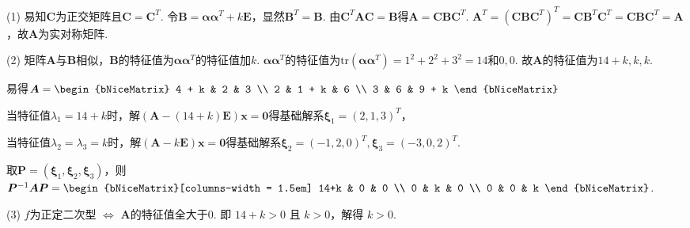 \documentclass[12pt, a4paper, oneside, UTF8]{ctexbook}
\begin{document}
\begin{solution}
    (1) 易知$\bm{C}$为正交矩阵且$\bm{C}=\bm{C}^T$. 令$\bm{B}=\bm{\alpha\alpha}^T+k\bm{E}$，显然$\bm{B}^T=\bm{B}$.
    由$\bm{C}^T\bm{AC}=\bm{B}$得$\bm{A}=\bm{C}\bm{B}\bm{C}^T$.
    $\bm{A}^T = (\bm{C}\bm{B}\bm{C}^T)^T = \bm{C}\bm{B}^T\bm{C}^T = \bm{C}\bm{B}\bm{C}^T = \bm{A}$，故$\bm{A}$为实对称矩阵.

    (2) 矩阵$\bm{A}$与$\bm{B}$相似，$\bm{B}$的特征值为$\bm{\alpha\alpha}^T$的特征值加$k$.
    $\bm{\alpha\alpha}^T$的特征值为$\text{tr}(\bm{\alpha\alpha}^T)=1^2+2^2+3^2=14$和$0,0$.
    故$\bm{A}$的特征值为$14+k, k, k$.
    
    易得$\bm{A}=\begin{bNiceMatrix}
        4 + k & 2 & 3 \\
        2 & 1 + k & 6 \\
        3 & 6 & 9 + k
    \end{bNiceMatrix}$

    当特征值$\lambda_1=14+k$时，解$(\bm{A}-(14+k)\bm{E})\bm{x}=\bm{0}$得基础解系$\bm{\xi}_1=(2,1,3)^T$，

    当特征值$\lambda_2=\lambda_3=k$时，解$(\bm{A}-k\bm{E})\bm{x}=\bm{0}$得基础解系$\bm{\xi}_2=(-1,2,0)^T, \bm{\xi}_3=(-3,0,2)^T$.

    取$\bm{P}=(\bm{\xi}_1, \bm{\xi}_2, \bm{\xi}_3)$，则$\bm{P}^{-1}\bm{AP} = \begin{bNiceMatrix}[columns-width = 1.5em]
        14+k & 0 & 0 \\
        0 & k & 0 \\
        0 & 0 & k
    \end{bNiceMatrix}$.


    (3) $f$为正定二次型 $\iff$ $\bm{A}$的特征值全大于0.
    即 $14+k>0$ 且 $k>0$，解得 $k>0$.
\end{solution}
\ifx\allfiles\undefined
\end{document}
